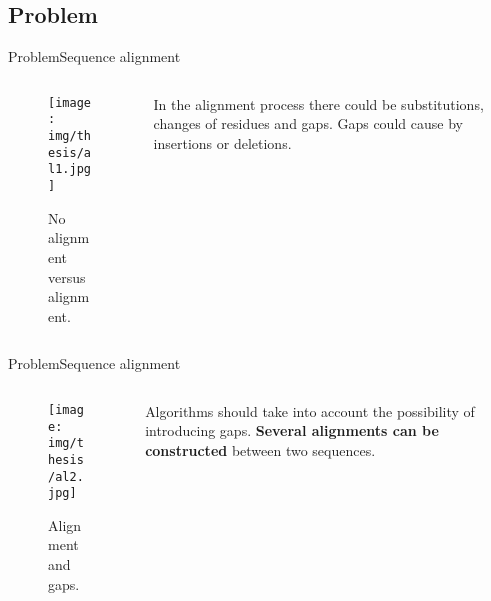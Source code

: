 \documentclass[10pt]{beamer}
\newcommand{\1}{
        	\setbeamertemplate{background}{
        		\texttt{[image: img/1]}
        		\tikz[overlay] \fill[fill opacity=0.75,fill=white] (0,0) rectangle (-\paperwidth,\paperheight);
        	}
}
\begin{document}
\subsection{Problem}


\begin{frame}{Problem}{Sequence alignment}
	\begin{columns}
		\begin{column}{0.48\textwidth}
			\begin{figure}[]
				\centering
				\texttt{[image: img/thesis/al1.jpg]}
				\label{img:alig}
				\caption{No alignment versus alignment.}
			\end{figure}
		\end{column}
		\begin{column}{0.48\textwidth}
			In the alignment process there could be substitutions, changes of residues and gaps. Gaps could cause by insertions or deletions.
		\end{column}
	\end{columns}
\end{frame}

\begin{frame}{Problem}{Sequence alignment}
	\begin{columns}
		\begin{column}{0.48\textwidth}
			\begin{figure}[]
				\centering
				\texttt{[image: img/thesis/al2.jpg]}
				\label{img:alig}
				\caption{Alignment and gaps.}
			\end{figure}
		\end{column}
		\begin{column}{0.48\textwidth}
			Algorithms should take into account the possibility of introducing gaps. \textbf{Several alignments can be constructed} between two sequences.
		\end{column}
	\end{columns}
	
\end{frame}
\end{document}
